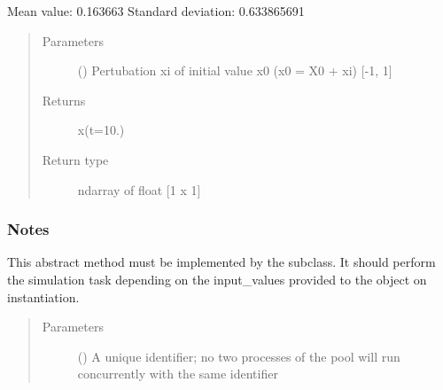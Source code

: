 \documentclass[letterpaper,10pt,english,openany,oneside]{sphinxmanual}
\begin{document}
\begin{fulllineitems}
Mean value: 0.163663
Standard deviation: 0.633865691
\begin{quote}\begin{description}
\item[{Parameters}] \leavevmode
{}\sphinxstyleliteralstrong{\sphinxupquote{{[}}}\sphinxstyleliteralstrong{\sphinxupquote{{]}}} (\sphinxstyleliteralemphasis{\sphinxupquote{ {[}}}\sphinxstyleliteralemphasis{\sphinxupquote{{]}}}) \textendash{} Pertubation xi of initial value x0 (x0 = X0 + xi) {[}-1, 1{]}

\item[{Returns}] \leavevmode
{} \textendash{} x(t=10.)

\item[{Return type}] \leavevmode
ndarray of float {[}1 x 1{]}

\end{description}\end{quote}
\subsubsection*{Notes}

\begin{figure}[htbp]
\centering

\noindent{}
\end{figure}

\begin{fulllineitems}
\label{\detokenize{pygpc.testfunctions:pygpc.testfunctions.testfunctions.MovingParticleFrictionForce.simulate}}
This abstract method must be implemented by the subclass.
It should perform the simulation task depending on the input\_values provided to the object on instantiation.
\begin{quote}\begin{description}
\item[{Parameters}] \leavevmode
{} () \textendash{} A unique identifier; no two processes of the pool will run concurrently with the same identifier


\end{description}
\end{quote}
\end{fulllineitems}
\end{fulllineitems}
\end{document}
